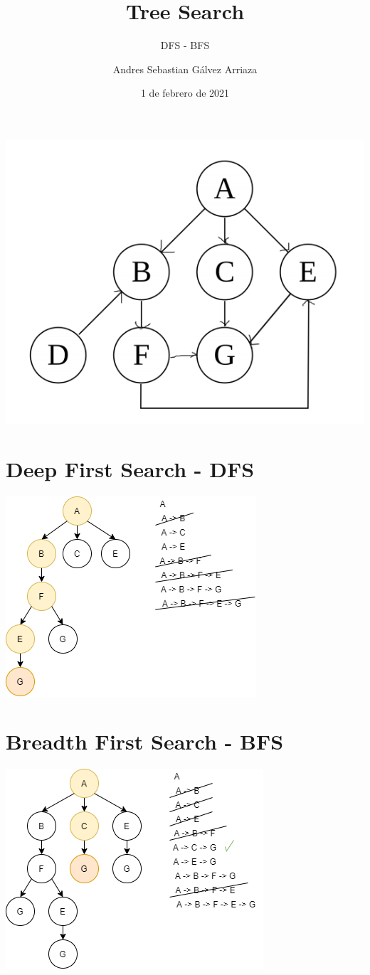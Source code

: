 \documentclass[]{scrreprt}
\title{Tree Search}
\subtitle{DFS - BFS}
\author{Andres Sebastian Gálvez Arriaza}
\date{1 de febrero de 2021}
\begin{document}
\maketitle
\graphicspath{ {images/} }

\centering
\includegraphics{Grafo}   

\section{Deep First Search - DFS}
\centering
\includegraphics{DFS}   

\section{Breadth First Search - BFS}
\centering
\includegraphics{BFS}
\end{document}
